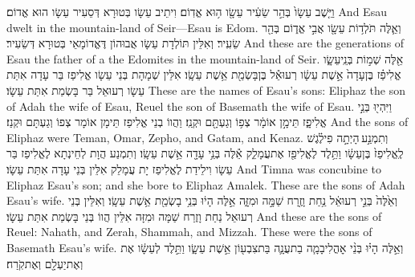 {וַיֵּ֤שֶׁב עֵשָׂו֙ בְּהַ֣ר שֵׂעִ֔יר עֵשָׂ֖ו ה֥וּא אֱדֽוֹם׃}
{וִיתֵיב עֵשָׂו בְּטוּרָא דְּסֵעִיר עֵשָׂו הוּא אֱדוֹם׃}
{And Esau dwelt in the mountain-land of Seir—Esau is Edom.}{}
{וְאֵ֛לֶּה תֹּלְד֥וֹת עֵשָׂ֖ו אֲבִ֣י אֱד֑וֹם בְּהַ֖ר שֵׂעִֽיר׃}
{וְאִלֵּין תּוֹלְדָת עֵשָׂו אֲבוּהוֹן דֶּאֱדוֹמָאֵי בְּטוּרָא דְּשֵׂעִיר׃}
{And these are the generations of Esau the father of a the Edomites in the mountain-land of Seir.}{}
{אֵ֖לֶּה שְׁמ֣וֹת בְּנֵֽי\maqqaf עֵשָׂ֑ו אֱלִיפַ֗ז בֶּן\maqqaf עָדָה֙ אֵ֣שֶׁת עֵשָׂ֔ו רְעוּאֵ֕ל בֶּן\maqqaf בָּשְׂמַ֖ת אֵ֥שֶׁת עֵשָֽׂו׃}
{אִלֵּין שְׁמָהָת בְּנֵי עֵשָׂו אֱלִיפַז בַּר עָדָה אִתַּת עֵשָׂו רְעוּאֵל בַּר בָּשְׂמַת אִתַּת עֵשָׂו׃}
{These are the names of Esau’s sons: Eliphaz the son of Adah the wife of Esau, Reuel the son of Basemath the wife of Esau.}{}
{וַיִּהְי֖וּ בְּנֵ֣י אֱלִיפָ֑ז תֵּימָ֣ן אוֹמָ֔ר צְפ֥וֹ וְגַעְתָּ֖ם וּקְנַֽז׃}
{וַהֲווֹ בְנֵי אֱלִיפַז תֵּימָן אוֹמָר צְפוֹ וְגַעְתָּם וּקְנַז׃}
{And the sons of Eliphaz were Teman, Omar, Zepho, and Gatam, and Kenaz.}{}
{וְתִמְנַ֣ע \legarmeh  הָיְתָ֣ה פִילֶ֗גֶשׁ לֶֽאֱלִיפַז֙ בֶּן\maqqaf עֵשָׂ֔ו וַתֵּ֥לֶד לֶאֱלִיפַ֖ז אֶת\maqqaf עֲמָלֵ֑ק אֵ֕לֶּה בְּנֵ֥י עָדָ֖ה אֵ֥שֶׁת עֵשָֽׂו׃}
{וְתִמְנַע הֲוָת לְחֵינְתָא לֶאֱלִיפַז בַּר עֵשָׂו וִילֵידַת לֶאֱלִיפַז יָת עֲמָלֵק אִלֵּין בְּנֵי עָדָה אִתַּת עֵשָׂו׃}
{And Timna was concubine to Eliphaz Esau’s son; and she bore to Eliphaz Amalek. These are the sons of Adah Esau’s wife.}{}
{וְאֵ֙לֶּה֙ בְּנֵ֣י רְעוּאֵ֔ל נַ֥חַת וָזֶ֖רַח שַׁמָּ֣ה וּמִזָּ֑ה אֵ֣לֶּה הָי֔וּ בְּנֵ֥י בָשְׂמַ֖ת אֵ֥שֶׁת עֵשָֽׂו׃}
{וְאִלֵּין בְּנֵי רְעוּאֵל נַחַת וָזֶרַח שַׁמָּה וּמִזָּה אִלֵּין הֲווֹ בְּנֵי בָּשְׂמַת אִתַּת עֵשָׂו׃}
{And these are the sons of Reuel: Nahath, and Zerah, Shammah, and Mizzah. These were the sons of Basemath Esau’s wife.}{}
{וְאֵ֣לֶּה הָי֗וּ בְּנֵ֨י אׇהֳלִיבָמָ֧ה בַת\maqqaf עֲנָ֛ה בַּת\maqqaf צִבְע֖וֹן אֵ֣שֶׁת עֵשָׂ֑ו וַתֵּ֣לֶד לְעֵשָׂ֔ו אֶת\maqqaf {} וְאֶת\maqqaf יַעְלָ֖ם וְאֶת\maqqaf קֹֽרַח׃}

